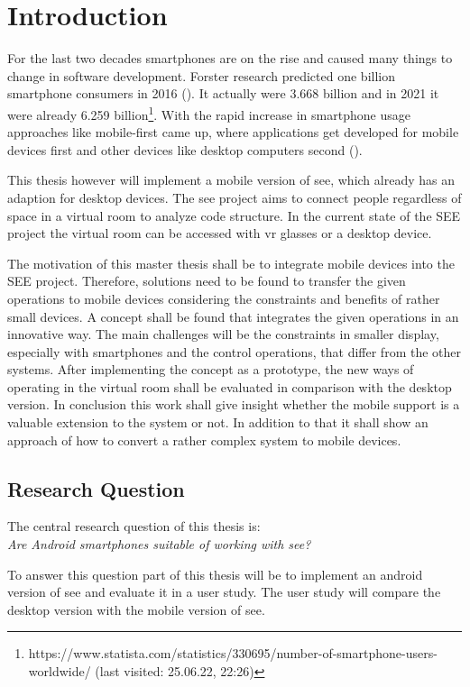 \section{Introduction}
For the last two decades smartphones are on the rise and caused many things to change in software development.
Forster research predicted one billion smartphone consumers in 2016 (\cite{schadler2012mobile}).
It actually were 3.668 billion and in 2021 it were already 6.259 billion\footnote{https://www.statista.com/statistics/330695/number-of-smartphone-users-worldwide/ (last visited: 25.06.22, 22:26)}.
With the rapid increase in smartphone usage approaches like mobile-first came up, where applications get developed for mobile devices first and other devices like desktop computers second (\cite{wroblewski2012mobile}).

This thesis however will implement a mobile version of \gls{see}, which already has an adaption for desktop devices.
The \gls{see} project aims to connect people regardless of space in a virtual room to analyze code structure.  
In the current state of the SEE project the virtual room can be accessed with \gls{vr} glasses or a desktop device.

The motivation of this master thesis shall be to integrate mobile devices into the SEE project. 
Therefore, solutions need to be found to transfer the given operations to mobile devices considering the constraints and benefits of rather small devices.
A concept shall be found that integrates the given operations in an innovative way. 
The main challenges will be the constraints in smaller display, especially with smartphones and the control operations, that differ from the other systems. 
After implementing the concept as a prototype, the new ways of operating in the virtual room shall be evaluated in comparison with the desktop version. 
In conclusion this work shall give insight whether the mobile support is a valuable extension to the system or not. 
In addition to that it shall show an approach of how to convert a rather complex system to mobile devices.

\subsection{Research Question}
\label{research}
The central research question of this thesis is: \\
\textit{Are Android smartphones suitable of working with \gls{see}?}

To answer this question part of this thesis will be to implement an \gls{android} version of \gls{see} and evaluate it in a user study.
The user study will compare the desktop version with the mobile version of \gls{see}.


